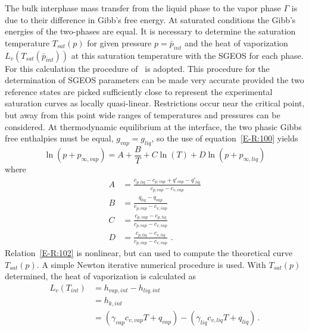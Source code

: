 The bulk interphase mass transfer from the liquid phase to the vapor
phase $\Gamma$ is due to their difference in Gibb's free energy.  At
saturated conditions the Gibb's energies of the two-phases are equal.
It is necessary to determine the saturation temperature $T_{sat}(p)$
for given pressure $p=\bar{p}_{int}$ and the heat of vaporization
$L_v\left(T_{sat}(\bar{p}_{int}) \right)$ at this saturation temperature
with the SGEOS for each phase.  For this calculation the procedure
of~\cite{SGEOS} is adopted.  This procedure for the
determination of SGEOS parameters can be made very accurate provided
the two reference states are picked sufficiently close to represent
the experimental saturation curves as locally quasi-linear.
Restrictions occur near the critical point, but away from this point
wide ranges of temperatures and pressures can be considered.  At
thermodynamic equilibrium at the interface, the two phasic Gibbs free
enthalpies must be equal, $g_{vap}=g_{liq}$, so the use of equation~\eqref{E-R:100}
yields
\begin{equation}
  \label{E-R:102}
  \ln \left( p + p_{\infty,  vap} \right) = A + \frac{B}{T} + C  \ln(T) + D  \ln \left( p + p_{\infty,  liq} \right)
\end{equation}
where
\begin{align}
  A &= \frac{c_{p, liq} - c_{p, vap} + q'_{vap} - q'_{liq}}{c_{p,  vap} - c_{v,  vap}} \\
  B &= \frac{q_{liq}-q_{vap}}{c_{p,  vap} - c_{v,  vap}} \\
  C &= \frac{c_{p, vap} - c_{p, liq}}{c_{p,  vap} - c_{v,  vap}} \\
  D &= \frac{c_{p, liq} - c_{v, liq}}{c_{p,  vap} - c_{v,  vap}} \,\,.
\end{align}
Relation~\eqref{E-R:102} is nonlinear, but can used to compute the
theoretical curve $T_{sat}(p)$.  A simple Newton iterative numerical
procedure is used.  With $T_{sat}(p)$ determined, the heat of
vaporization is calculated as
\begin{align}
  \nonumber
  L_v \left( T_{int} \right) &= h_{vap,  int} - h_{liq,  int}
  \\
  \nonumber
  &= h_{k,  int}
  \\
  &= \left( \gamma_{vap}  c_{v, vap}  T + q_{vap} \right) - \left( \gamma_{liq}  c_{v, liq}  T + q_{liq} \right) \,.
\end{align}
%
